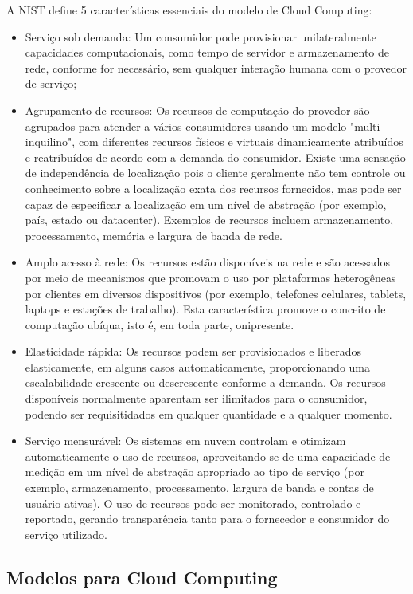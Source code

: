 \documentclass[twosideprint]{politex}
\begin{document}
A NIST define 5 características essenciais do modelo de Cloud Computing:
\begin{itemize}
	\item Serviço sob demanda: Um consumidor pode provisionar unilateralmente capacidades computacionais, como tempo de servidor e armazenamento de rede, conforme for necessário, sem qualquer interação humana com o provedor de serviço;
	\item Agrupamento de recursos: Os recursos de computação do provedor são agrupados para atender a vários consumidores usando um modelo "multi inquilino", com diferentes recursos físicos e virtuais dinamicamente atribuídos e reatribuídos de acordo com a demanda do consumidor. Existe uma sensação de independência de localização pois o cliente geralmente não tem controle ou conhecimento sobre a localização exata dos recursos fornecidos, mas pode ser capaz de especificar a localização em um nível de abstração (por exemplo, país, estado ou datacenter). Exemplos de recursos incluem armazenamento, processamento, memória e largura de banda de rede.
	\item Amplo acesso à rede: Os recursos estão disponíveis na rede e são acessados por meio de mecanismos que promovam o uso por plataformas heterogêneas por clientes em diversos dispositivos (por exemplo, telefones celulares, tablets, laptops e estações de trabalho). Esta característica promove o conceito de computação ubíqua, isto é, em toda parte, onipresente.
	\item Elasticidade rápida: Os recursos podem ser provisionados e liberados elasticamente, em alguns casos automaticamente, proporcionando uma escalabilidade crescente ou descrescente conforme a demanda. Os recursos disponíveis normalmente aparentam ser ilimitados para o consumidor, podendo ser requisitidados em qualquer quantidade e a qualquer momento.
	\item Serviço mensurável: Os sistemas em nuvem controlam e otimizam automaticamente o uso de recursos, aproveitando-se de uma capacidade de medição em um nível de abstração apropriado ao tipo de serviço (por exemplo, armazenamento, processamento, largura de banda e contas de usuário ativas). O uso de recursos pode ser monitorado, controlado e reportado, gerando transparência tanto para o fornecedor e consumidor do serviço utilizado.
\end{itemize}

\subsection{Modelos para Cloud Computing}
\end{document}
